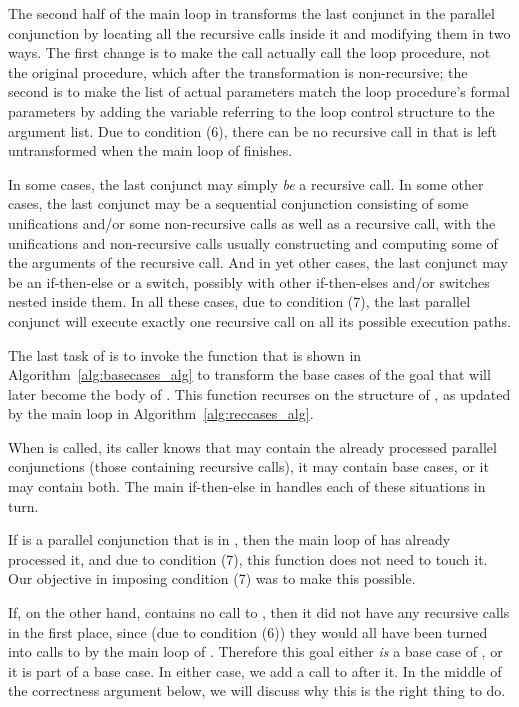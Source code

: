 The second half of the main loop in \createloopgoal
transforms the last conjunct in the parallel conjunction
by locating all the recursive calls inside it
and modifying them in two ways.
The first change is to make the call actually call the loop procedure,
not the original procedure, which after the transformation is non-recursive;
the second is to make the list of actual parameters match
the loop procedure's formal parameters
by adding the variable referring to the loop control structure
to the argument list.
Due to condition (6),
there can be no recursive call in  that is left untransformed
when the main loop of \createloopgoal finishes.

In some cases, the last conjunct may simply \emph{be} a recursive call.
In some other cases, the last conjunct may be a sequential conjunction
consisting of some unifications and/or some non-recursive calls
as well as a recursive call,
with the unifications and non-recursive calls
usually constructing and computing some of the arguments of the recursive call.
And in yet other cases,
the last conjunct may be an if-then-else or a switch,
possibly with other if-then-elses and/or switches nested inside them.
In all these cases, due to condition (7),
the last parallel conjunct will execute exactly one recursive call
on all its possible execution paths.

The last task of \createloopgoal is to invoke the
\putbarriers function
that is shown in Algorithm~\ref{alg:basecases_alg}
to transform the base cases of the goal
that will later become the body of .
This function recurses on the structure of ,
as updated by the main loop in Algorithm~\ref{alg:reccases_alg}.

When \putbarriers is called,
its caller knows that  may contain
the already processed parallel conjunctions (those containing recursive calls),
it may contain base cases,
or it may contain both.
The main if-then-else in \putbarriers
handles each of these situations in turn.

If  is a parallel conjunction that is in ,
then the main loop of \createloopgoal has already processed it,
and due to condition (7), this function does not need to touch it.
Our objective in imposing condition (7) was to make this possible.

If, on the other hand,  contains no call to ,
then it did not have any recursive calls in the first place,
since (due to condition (6))
they would all have been turned into calls to 
by the main loop of \createloopgoal.
Therefore this goal either \emph{is} a base case of ,
or it is part of a base case.
In either case, we add a call to  after it.
In the middle of the correctness argument below,
we will discuss why this is the right thing to do.

